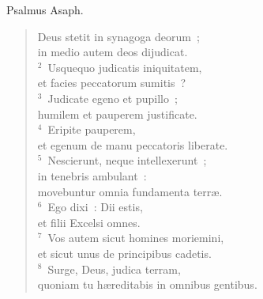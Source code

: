 \lettrine[lines=3,image=true,loversize=0.05,lraise=-0.03]{P}{}salmus Asaph. \begin{flushleft}\begin{verse}\vspace{6pt}Deus stetit in synagoga deorum~;\\ in medio autem deos dijudicat.\\
${}^{2}$~Usquequo judicatis iniquitatem,\\ et facies peccatorum sumitis~?\\
${}^{3}$~Judicate egeno et pupillo~;\\ humilem et pauperem justificate.\\
${}^{4}$~Eripite pauperem,\\ et egenum de manu peccatoris liberate.\\
${}^{5}$~Nescierunt, neque intellexerunt~;\\ in tenebris ambulant~:\\ movebuntur omnia fundamenta terr\ae .\\
${}^{6}$~Ego dixi~: Dii estis,\\ et filii Excelsi omnes.\\
${}^{7}$~Vos autem sicut homines moriemini,\\ et sicut unus de principibus cadetis.\\
${}^{8}$~Surge, Deus, judica terram,\\ quoniam tu h\ae reditabis in omnibus gentibus.\end{verse}\end{flushleft}



